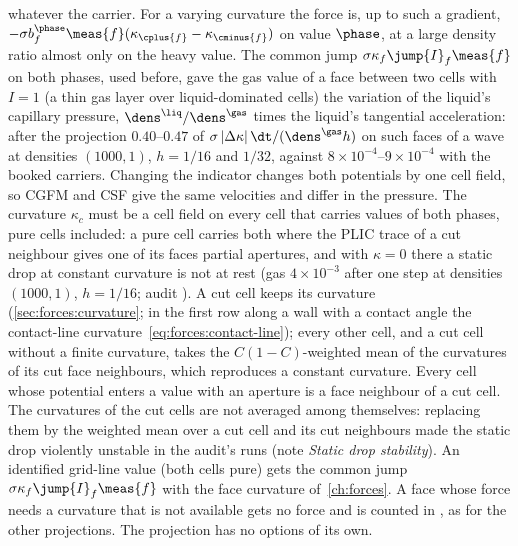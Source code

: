 whatever the carrier.
For a varying curvature the force is, up to such a gradient,
$-\sigma b^{\phase}_f\meas{f}(\kappa_{\cplus{f}}-\kappa_{\cminus{f}})$
on value $\phase$, at a large density ratio almost only on the heavy value. The common jump $\sigma\kappa_f\jump{I}_f\meas{f}$ on both
phases, used before, gave the gas value of a face between two cells with
$I=1$ (a thin gas layer over liquid-dominated cells) the variation of the
liquid's capillary pressure, $\dens^{\liq}/\dens^{\gas}$ times the liquid's
tangential acceleration: after the projection $0.40$--$0.47$ of
$\sigma\abs{\Delta\kappa}\dt/(\dens^{\gas}h)$ on such faces of a wave at
densities $(1000,1)$, $h=1/16$ and $1/32$, against $8\times10^{-4}$--$9\times10^{-4}$
with the booked carriers. Changing the indicator changes both potentials by one cell field,
so CGFM and CSF give the same velocities and differ in the pressure. The
curvature $\kappa_c$ must be a cell field on every cell that carries values
of both phases, pure cells included: a pure cell carries both where the PLIC
trace of a cut neighbour gives one of its faces partial apertures, and with
$\kappa=0$ there a static drop at constant curvature is not at rest (gas
$4\times10^{-3}$ after one step at densities $(1000,1)$, $h=1/16$; audit
). A cut cell keeps its curvature
(\cref{sec:forces:curvature}; in the first row along a wall with a contact
angle the contact-line curvature~\cref{eq:forces:contact-line}); every
other cell, and a cut cell without a finite curvature, takes the
$C(1-C)$-weighted mean of the curvatures of its cut face
neighbours, which reproduces a constant curvature. Every cell whose potential
enters a value with an aperture is a face neighbour of a cut cell. The
curvatures of the cut cells are not averaged among themselves: replacing them
by the weighted mean over a cut cell and its cut neighbours made the static
drop violently unstable in the audit's runs (note \emph{Static drop
stability}). An identified grid-line value (both cells pure) gets the common
jump $\sigma\kappa_f\jump{I}_f\meas{f}$ with the face curvature
of~\cref{ch:forces}. A face whose force needs a curvature that is not
available gets no force and is counted in ,
as for the other projections. The projection has no options of its own.

